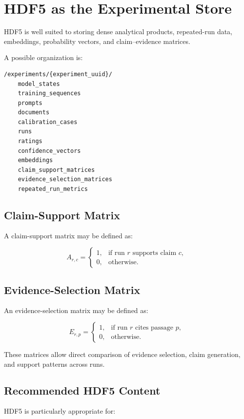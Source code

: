 \documentclass[11pt]{report}
\begin{document}
\chapter{HDF5 as the Experimental Store}

HDF5 is well suited to storing dense analytical products, repeated-run data, embeddings, probability vectors, and claim--evidence matrices.

A possible organization is:

\begin{verbatim}
/experiments/{experiment_uuid}/
    model_states
    training_sequences
    prompts
    documents
    calibration_cases
    runs
    ratings
    confidence_vectors
    embeddings
    claim_support_matrices
    evidence_selection_matrices
    repeated_run_metrics
\end{verbatim}

\section{Claim-Support Matrix}

A claim-support matrix may be defined as:

\[
A_{r,c}
=
\begin{cases}
1, & \text{if run } r \text{ supports claim } c,\\
0, & \text{otherwise}.
\end{cases}
\]

\section{Evidence-Selection Matrix}

An evidence-selection matrix may be defined as:

\[
E_{r,p}
=
\begin{cases}
1, & \text{if run } r \text{ cites passage } p,\\
0, & \text{otherwise}.
\end{cases}
\]

These matrices allow direct comparison of evidence selection, claim generation, and support patterns across runs.

\section{Recommended HDF5 Content}

HDF5 is particularly appropriate for:
\end{document}

